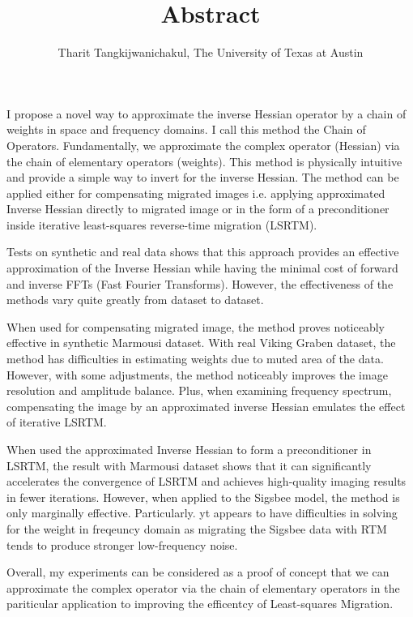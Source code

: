 \author{Tharit Tangkijwanichakul, The University of Texas at Austin}
\title{Abstract}
\label{ch:abs}
I propose a novel way to approximate the inverse Hessian operator by a chain of weights in space and frequency domains. I call this method the Chain of Operators. Fundamentally, we approximate the complex operator (Hessian) via the chain of elementary operators (weights). This method is physically intuitive and provide a simple way to invert for the inverse Hessian. The method can be applied either for compensating migrated images i.e. applying approximated Inverse Hessian directly to migrated image or in the form of a preconditioner inside iterative least-squares reverse-time migration (LSRTM). 

Tests on synthetic and real data shows that this approach provides an effective approximation of the Inverse Hessian while having the minimal cost of forward and inverse FFTs (Fast Fourier Transforms). However, the effectiveness of the methods vary quite greatly from dataset to dataset.

When used for compensating migrated image, the method proves noticeably effective in synthetic Marmousi dataset. With real Viking Graben dataset, the method has difficulties in estimating weights due to muted area of the data. However, with some adjustments, the method noticeably improves the image resolution and amplitude balance. Plus, when examining frequency spectrum, compensating the image by an approximated inverse Hessian emulates the effect of iterative LSRTM. 


When used the approximated Inverse Hessian to form a preconditioner in LSRTM, the result with Marmousi dataset shows that it can significantly accelerates the convergence of LSRTM and achieves high-quality imaging results in fewer iterations. However, when applied to the Sigsbee model, the method is only marginally effective. Particularly. yt appears to have difficulties in solving for the weight in freqeuncy domain as migrating the Sigsbee data with RTM tends to produce stronger low-frequency noise.

Overall, my experiments can be considered as a proof of concept that we can approximate the complex operator via the chain of elementary operators in the pariticular application to improving the efficentcy of Least-squares Migration.